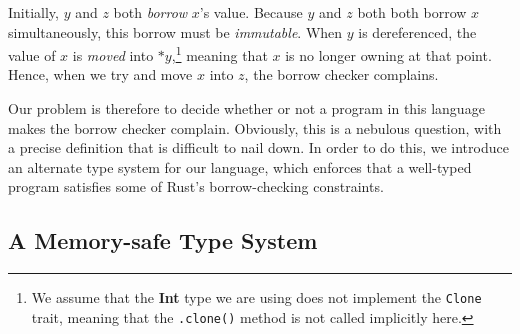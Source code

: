 \documentclass{article}
\renewcommand\em{\bfseries}
\newcommand{\deref}{\mathbf{*}}
\begin{document}
Initially, $y$ and $z$ both \textit{borrow} $x$'s value. Because $y$ and $z$ both both borrow $x$ simultaneously, this borrow must be \textit{immutable}. When $y$ is dereferenced, the value of $x$ is \textit{moved} into $\deref y$,\footnote{We assume that the \textbf{Int} type we are using does not implement the \texttt{Clone} trait, meaning that the \texttt{.clone()} method is not called implicitly here.} meaning that $x$ is no longer owning at that point. Hence, when we try and move $x$ into $z$, the borrow checker complains. 

Our problem is therefore to decide whether or not a program in this language makes the borrow checker complain. Obviously, this is a nebulous question, with a precise definition that is difficult to nail down. In order to do this, we introduce an alternate type system for our language, which enforces that a well-typed program satisfies some of Rust's borrow-checking constraints.

\subsection{A Memory-safe Type System}


\renewcommand\em{\it}
\printbibliography[title={References}]
\end{document}
